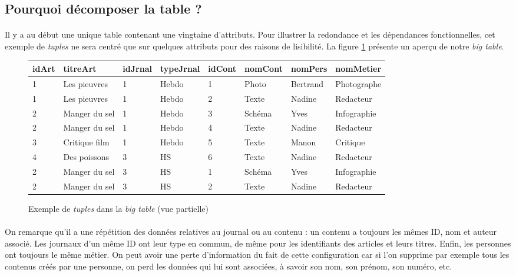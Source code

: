 \subsection{Pourquoi décomposer la table ?}
\paragraph{}{Il y a au début une unique table contenant une vingtaine d'attributs. Pour illustrer la redondance et les dépendances fonctionnelles, cet exemple de \textit{tuples} ne sera centré que sur quelques attributs pour des raisons de lisibilité. La figure \ref{bigtableex} présente un aperçu de notre \textit{big table}.}

\begin{figure}
    {
	\centering
    \begin{tabular}{|l|l|l|l|l|l|l|l|}
        \hline idArt & titreArt & idJrnal & typeJrnal & idCont & nomCont & nomPers & nomMetier \\ 
        \hline 1 & Les pieuvres & 1 & Hebdo & 1 & Photo & Bertrand & Photographe \\ 
        \hline 1 & Les pieuvres & 1 & Hebdo & 2 &Texte & Nadine & Redacteur \\ 
        \hline 2 & Manger du sel & 1 & Hebdo & 3 & Schéma & Yves & Infographie \\ 
        \hline 2 & Manger du sel & 1 & Hebdo & 4 & Texte & Nadine & Redacteur \\ 
        \hline 3 & Critique film & 1 & Hebdo & 5 & Texte & Manon & Critique \\ 
        \hline 4 & Des poissons & 3 & HS & 6 & Texte & Nadine & Redacteur \\ 
        \hline 2 & Manger du sel & 3 & HS & 1 & Schéma & Yves & Infographie \\ 
        \hline 2 & Manger du sel & 3 & HS & 2 & Texte & Nadine & Redacteur \\ 
        \hline 
    \end{tabular}
    \label{bigtableex}
    }
\caption{Exemple de \textit{tuples} dans la \textit{big table} (vue partielle)}
\end{figure} 

\paragraph{}{On remarque qu'il a une répétition des données relatives au journal ou au contenu : un contenu a toujours les mêmes ID, nom et auteur associé. Les journaux d'un même ID ont leur type en commun, de même pour les identifiants des articles et leurs titres. Enfin, les personnes ont toujours le même métier. On peut avoir une perte d'information du fait de cette configuration car si l'on supprime par exemple tous les contenus créés par une personne, on perd les données qui lui sont associées, à savoir son nom, son prénom, son numéro, etc.}

